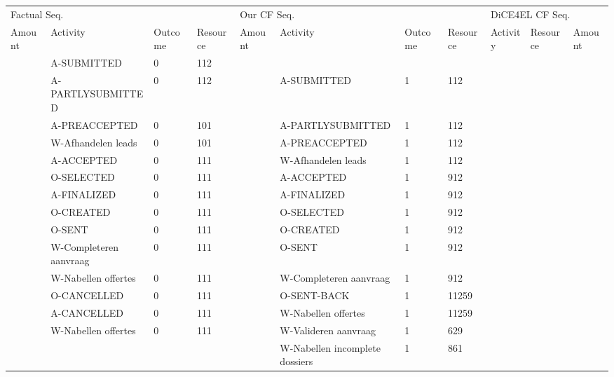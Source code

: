 \begin{tabular}{lllllllllll}
\toprule
\multicolumn{4}{l}{Factual Seq.} & \multicolumn{4}{l}{Our CF Seq.} & \multicolumn{3}{l}{DiCE4EL CF Seq.} \\
Amount & Activity & Outcome & Resource & Amount & Activity & Outcome & Resource & Activity & Resource & Amount \\
\midrule
 & A-SUBMITTED & 0 & 112 &  &  &  &  &  &  &  \\
 & A-PARTLYSUBMITTED & 0 & 112 &  & A-SUBMITTED & 1 & 112 &  &  &  \\
 & A-PREACCEPTED & 0 & 101 &  & A-PARTLYSUBMITTED & 1 & 112 &  &  &  \\
 & W-Afhandelen leads & 0 & 101 &  & A-PREACCEPTED & 1 & 112 &  &  &  \\
 & A-ACCEPTED & 0 & 111 &  & W-Afhandelen leads & 1 & 112 &  &  &  \\
 & O-SELECTED & 0 & 111 &  & A-ACCEPTED & 1 & 912 &  &  &  \\
 & A-FINALIZED & 0 & 111 &  & A-FINALIZED & 1 & 912 &  &  &  \\
 & O-CREATED & 0 & 111 &  & O-SELECTED & 1 & 912 &  &  &  \\
 & O-SENT & 0 & 111 &  & O-CREATED & 1 & 912 &  &  &  \\
 & W-Completeren aanvraag & 0 & 111 &  & O-SENT & 1 & 912 &  &  &  \\
 & W-Nabellen offertes & 0 & 111 &  & W-Completeren aanvraag & 1 & 912 &  &  &  \\
 & O-CANCELLED & 0 & 111 &  & O-SENT-BACK & 1 & 11259 &  &  &  \\
 & A-CANCELLED & 0 & 111 &  & W-Nabellen offertes & 1 & 11259 &  &  &  \\
 & W-Nabellen offertes & 0 & 111 &  & W-Valideren aanvraag & 1 & 629 &  &  &  \\
 &  &  &  &  & W-Nabellen incomplete dossiers & 1 & 861 &  &  &  \\
\bottomrule
\end{tabular}
